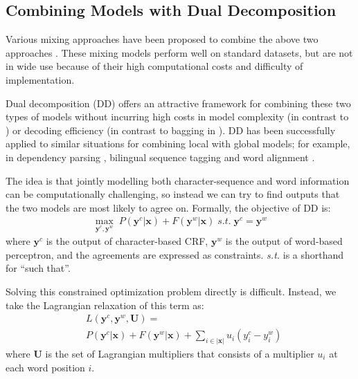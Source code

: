 \subsection{Combining Models with Dual Decomposition} 
Various mixing approaches have been proposed to combine the above two approaches \cite{Wang:2006:SIGHAN,Lin:2009:CICLing,Sun:2009:HLT-NAACL,Sun:2010:COLING,Wang:2010:COLING}. 
These mixing models perform well on standard datasets, but are not in wide use because of their high computational costs and difficulty of implementation.

Dual decomposition (DD) \cite{Rush:2010:EMNLP} offers an attractive framework for combining these two types of models without incurring high costs in model complexity (in contrast to \cite{Sun:2009:HLT-NAACL}) or decoding efficiency (in contrast to bagging in \cite{Wang:2006:SIGHAN,Sun:2010:COLING}). DD has been successfully applied to similar situations for combining local with global models; for example, in dependency parsing \cite{Koo:2010:EMNLP}, bilingual sequence tagging \cite{Wang:2013:ACL} and word alignment \cite{Denero:2011:ACL}.  

The idea is that jointly modelling both character-sequence and word information can be computationally challenging, so instead we can try to find outputs that the two models are most likely to agree on.
Formally, the objective of DD is:
\begin{align}
   \max_{\mathbf{y^\textit{c}}, \mathbf{y^\textit{w}}}  \; P(\mathbf{y^\textit{c}} | \mathbf{x}) + F(\mathbf{y^\textit{w}} | \mathbf{x}) \;  s.t. \; \mathbf{y^\textit{c}} = \mathbf{y^\textit{w}}
\end{align}
\noindent where $\mathbf{y^\textit{c}}$ is the output of character-based CRF, $\mathbf{y^\textit{w}}$ is the output of word-based perceptron, 
and the agreements  are expressed as constraints. \textit{s.t.} is a shorthand for ``such that''.

Solving this constrained optimization problem directly is difficult. 
Instead, we take the Lagrangian relaxation of this term as:
\begin{align}
& L\left(\mathbf{y^\textit{c}}, \mathbf{y^\textit{w}}, \mathbf{U}\right) =  \\ 
& P(\mathbf{y^\textit{c}} | \mathbf{x}) + F(\mathbf{y^\textit{w}} | \mathbf{x}) +  \sum\limits_{i\in |\mathbf{x}|}{u_{i}(y_i^\textit{c}-y_i^\textit{w})}  \nonumber \label{eq:sub}
\end{align}
\noindent where $ \mathbf{U}$ is the set of Lagrangian multipliers that consists of a multiplier $u_i$ at each word position $i$. 

